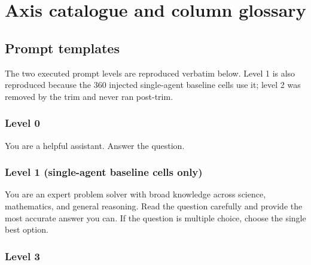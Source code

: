 \section{Axis catalogue and column glossary}
\label{app:axes}

\subsection{Prompt templates}

The two executed prompt levels are reproduced verbatim below. Level 1 is also reproduced
because the 360 injected single-agent baseline cells use it; level 2 was removed by the
trim and never ran post-trim.

\subsubsection*{Level 0}

\begin{promptquote}
You are a helpful assistant. Answer the question.
\end{promptquote}

\subsubsection*{Level 1 (single-agent baseline cells only)}

\begin{promptquote}
You are an expert problem solver with broad knowledge across science, mathematics, and
general reasoning. Read the question carefully and provide the most accurate answer you
can. If the question is multiple choice, choose the single best option.
\end{promptquote}

\subsubsection*{Level 3}

